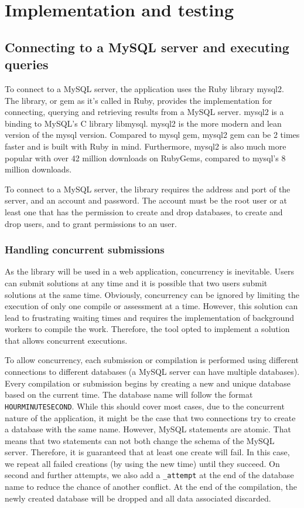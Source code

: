 \chapter{Implementation and testing}

\section{Connecting to a MySQL server and executing queries} \label{ch:impllib:sec:connecting}
To connect to a MySQL server, the application uses the Ruby library mysql2. The library, or gem as it's called in Ruby, provides the implementation for connecting, querying and retrieving results from a MySQL server. mysql2 is a binding to MySQL's C library libmysql. mysql2 is the more modern and lean version of the mysql version. Compared to mysql gem, mysql2 gem can be 2 times faster and is built with Ruby in mind. Furthermore, mysql2 is also much more popular with over 42 million downloads on RubyGems, compared to mysql's 8 million downloads.

To connect to a MySQL server, the library requires the address and port of the server, and an account and password. The account must be the root user or at least one that has the permission to create and drop databases, to create and drop users, and to grant permissions to an user.

\subsection{Handling concurrent submissions}

As the library will be used in a web application, concurrency is inevitable. Users can submit solutions at any time and it is possible that two users submit solutions at the same time. Obviously, concurrency can be ignored by limiting the execution of only one compile or assessment at a time. However, this solution can lead to frustrating waiting times and requires the implementation of background workers to compile the work. Therefore, the tool opted to implement a solution that allows concurrent executions.

To allow concurrency, each submission or compilation is performed using different connections to different databases (a MySQL server can have multiple databases).  Every compilation or submission begins by creating a new and unique database based on the current time. The database name will follow the format \texttt{HOURMINUTESECOND}. While this should cover most cases, due to the concurrent nature of the application, it might be the case that two connections try to create a database with the same name. However, MySQL statements are atomic. That means that two statements can not both change the schema of the MySQL server. Therefore, it is guaranteed that at least one create will fail. In this case, we repeat all failed creations (by using the new time) until they succeed. On second and further attempts, we also add a \texttt{_attempt} at the end of the database name to reduce the chance of another conflict. At the end of the compilation, the newly created database will be dropped and all data associated discarded.

